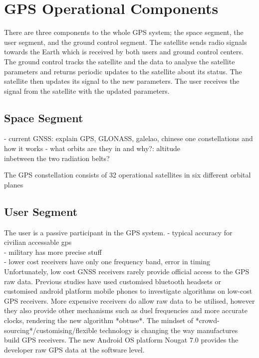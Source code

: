 

\section{GPS Operational Components}
There are three components to the whole GPS system; the space segment, the user segment, and the ground control segment. The satellite sends radio signals towards the Earth which is received by both users and ground control centers. The ground control tracks the satellite and the data to analyse the satellite parameters and returns periodic updates to the satellite about its status. The satellite then updates its signal to the new parameters. The user receives the signal from the satellite with the updated parameters.

\subsection{Space Segment}
- current GNSS: explain GPS, GLONASS, galelao, chinese one constellations and how it works
- what orbits are they in and why?: altitude\\
inbetween the two radiation belts?

The GPS constellation consists of 32 operational satellites in six different orbital planes



\subsection{User Segment}
The user is a passive participant in the GPS system.
- typical accuracy for civilian accessable gps\\
- military has more precise stuff\\
- lower cost receivers have only one frequency band, error in timing\\
Unfortunately, low cost GNSS receivers rarely provide official access to the GPS raw data. Previous studies have used customised bluetooth headsets or customised android platform mobile phones to investigate algorithms on low-cost GPS receivers. More expensive receivers do allow raw data to be utilised, however they also provide other mechanisms such as duel frequencies and more accurate clocks, rendering the new algorithm *obtuse*. The mindset of *crowd-sourcing*/customising/flexible technology is changing the way manufactures build GPS receivers. The new Android OS platform Nougat 7.0 provides the developer raw GPS data at the software level.  


